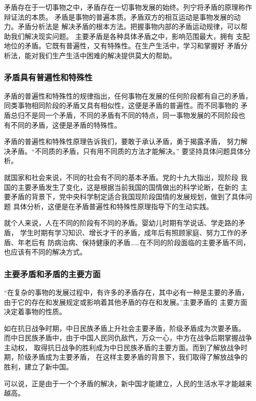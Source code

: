 \documentclass{article}
\begin{document}
    矛盾存在于一切事物之中，矛盾存在一切事物发展的始终。列宁将矛盾的原理称作辩证法的本质。
    矛盾是事物的普遍本质。矛盾双方的相互运动是事物发展的动力。矛盾分析法是
    解决矛盾的根本方法。把握事物内部的矛盾运动规律，可以帮助我们解决现实问题。
    主要矛盾是各种具体矛盾之中，影响范围最大，拥有
    支配地位的矛盾。它既有普遍性，又有特殊性。在生产生活中，学习和掌握好
    矛盾分析法，能对我们生产生活中困难的解决提供莫大的帮助。
        \subsubsection{矛盾具有普遍性和特殊性}
        矛盾的普遍性和特殊性的规律指出，任何事物在发展的任何阶段都有自己的矛盾，
        同类事物相同阶段的矛盾又具有相似性，这便是矛盾的普遍性。而不同事物的
        矛盾总归不是同一个矛盾，不同的矛盾有不同的特点，同一事物发展的不同阶段也
        有不同的矛盾，这便是矛盾的特殊性。\par
        矛盾的普遍性和特殊性原理告诉我们，要敢于承认矛盾，勇于揭露矛盾，
        努力解决矛盾。“不同质的矛盾，只有用不同质的方法才能解决。”\cite{毛泽东}
        要坚持具体问题具体分析。\par
        就国家和社会来说，不同的社会有不同的基本矛盾。党的十九大指出，现阶段
        我国的主要矛盾发生了变化，这是根据当前我国的国情做出的科学论断，在新的
        主要矛盾的背景下，党中央科学制定适合我国现阶段国情的发展规划，做到了具体问题
        具体分析，这便是在矛盾普遍性和特殊性原理指导下的生动实践。\par
        就个人来说，人在不同的阶段有不同的矛盾。婴幼儿时期有学说话、学走路的矛盾，
        学生时期有学习知识、增长才干的矛盾，成年后有照顾家庭、努力工作的矛盾、年老后有
        防病治病、保持健康的矛盾……在不同的阶段面临的主要矛盾不同，也应该有不同的解决方式。
        \subsubsection{主要矛盾和矛盾的主要方面}
        “在复杂的事物的发展过程中，有许多的矛盾存在，其中必有一种是主要的矛盾，
        由于它的存在和发展规定或影响着其他矛盾的存在和发展。”\cite{毛泽东}主要矛盾的
        主要方面决定着事物的性质。\par
        如在抗日战争时期，中日民族矛盾上升社会主要矛盾，阶级矛盾成为次要矛盾。
        而中日民族矛盾中，由于中国人民同仇敌忾，万众一心，中方在战争后期掌握战争主动权，
        取得抗日战争的胜利成为中日民族矛盾的主要方面。而到了解放战争时期，阶级矛盾成为主要矛盾，
        在这样主要矛盾的背景下，我们取得了解放战争的胜利，建立了新中国。\par
        可以说，正是由于一个个矛盾的解决，新中国才能建立，人民的生活水平才能越来越高。
\end{document}
